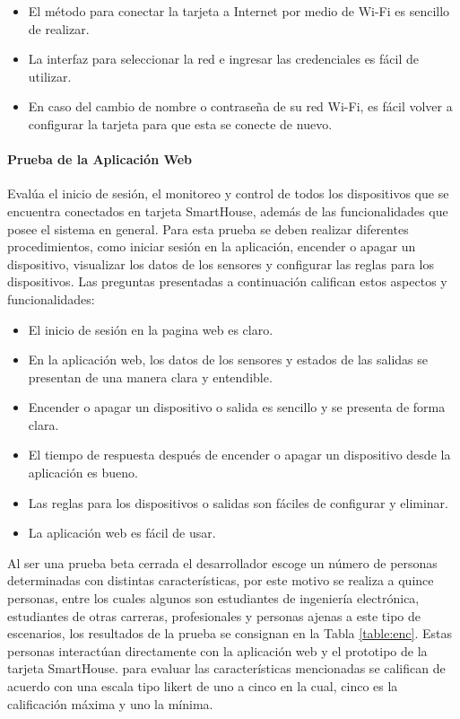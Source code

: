 \begin{itemize}
\item El método para conectar la tarjeta a Internet por medio de Wi-Fi es sencillo de realizar.
\item La interfaz para seleccionar la red e ingresar las credenciales es fácil de utilizar.
\item En caso del cambio de nombre o contraseña de su red Wi-Fi, es fácil volver a configurar la tarjeta para que esta se conecte de nuevo.
\end{itemize}

\paragraph{Prueba de la Aplicación Web} Evalúa el inicio de sesión, el monitoreo y control de todos los dispositivos que se encuentra conectados en tarjeta SmartHouse, además de las funcionalidades que posee el sistema en general. Para esta prueba se deben realizar diferentes procedimientos, como iniciar sesión en la aplicación, encender o apagar un dispositivo, visualizar los datos de los sensores y configurar las reglas para los dispositivos. Las preguntas presentadas a continuación califican estos aspectos y funcionalidades:\\

\begin{itemize}
	\item El inicio de sesión en la pagina web es claro.
	\item En la aplicación web, los datos de los sensores y estados de las salidas se presentan de una manera clara y entendible.
	\item Encender o apagar un dispositivo o salida es sencillo y se presenta de forma clara.
	\item El tiempo de respuesta después de encender o apagar un dispositivo desde la aplicación es bueno.
	\item Las reglas para los dispositivos o salidas son fáciles de configurar y eliminar.
	\item La aplicación web es fácil de usar.
\end{itemize}

Al ser una prueba beta cerrada el desarrollador escoge un número de personas determinadas con distintas características, por este motivo se realiza a quince personas, entre los cuales algunos son estudiantes de ingeniería electrónica, estudiantes de otras carreras, profesionales y personas ajenas a este tipo de escenarios, los resultados de la prueba se consignan en la Tabla \ref{table:enc}. Estas personas interactúan directamente con la aplicación web y el prototipo de la tarjeta SmartHouse. para evaluar las características mencionadas se califican de acuerdo con una escala tipo likert \cite{lik} de uno a cinco en la cual, cinco es la calificación máxima y uno la mínima.\\


